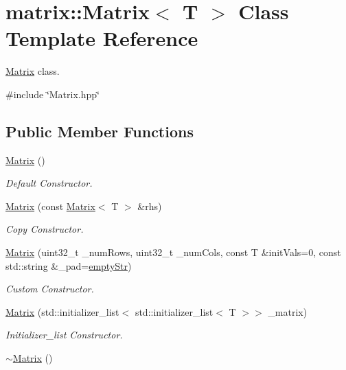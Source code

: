 \hypertarget{classmatrix_1_1Matrix}{\section{matrix\-:\-:Matrix$<$ T $>$ Class Template Reference}
\label{classmatrix_1_1Matrix}
}


\hyperlink{classmatrix_1_1Matrix}{Matrix} class.  




{\ttfamily \#include \char`\"{}Matrix.\-hpp\char`\"{}}

\subsection*{Public Member Functions}
\begin{DoxyCompactItemize}
\item 
\hyperlink{classmatrix_1_1Matrix_a054d22cc5b7c78711c823310f71495f5}{Matrix} ()
\begin{DoxyCompactList}\small\item\em Default Constructor. \end{DoxyCompactList}\item 
\hyperlink{classmatrix_1_1Matrix_a2197dc025b1a32ceba87677d0d5b988d}{Matrix} (const \hyperlink{classmatrix_1_1Matrix}{Matrix}$<$ T $>$ \&rhs)
\begin{DoxyCompactList}\small\item\em Copy Constructor. \end{DoxyCompactList}\item 
\hyperlink{classmatrix_1_1Matrix_a823e33972f72b1f942099982dc101fea}{Matrix} (uint32\-\_\-t \-\_\-num\-Rows, uint32\-\_\-t \-\_\-num\-Cols, const T \&init\-Vals=0, const std\-::string \&\-\_\-pad=\hyperlink{namespacematrix_a3410a3377815b8c5431e5436a31774c4}{empty\-Str})
\begin{DoxyCompactList}\small\item\em Custom Constructor. \end{DoxyCompactList}\item 
\hyperlink{classmatrix_1_1Matrix_ab79912b5a12d7aa327e6bf0d918f4de9}{Matrix} (std\-::initializer\-\_\-list$<$ std\-::initializer\-\_\-list$<$ T $>$$>$ \-\_\-matrix)
\begin{DoxyCompactList}\small\item\em Initializer\-\_\-list Constructor. \end{DoxyCompactList}\item 
\hyperlink{classmatrix_1_1Matrix_a936cd883f1768e78478925929ea3d147}{$\sim$\-Matrix} ()
$$
\end{DoxyCompactItemize}
